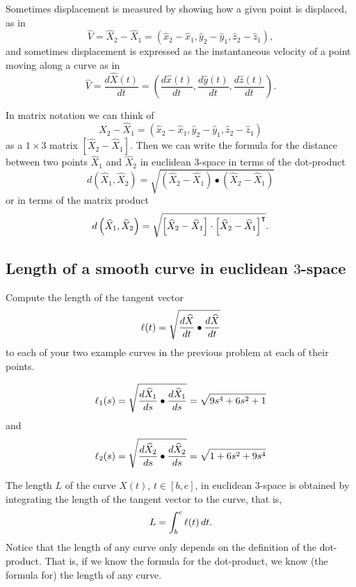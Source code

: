 \documentclass{ximera}
\begin{document}
Sometimes displacement is measured by showing how a given point is displaced,
as in%
\[
\hat{V}=\hat{X}_{2}-\hat{X}_{1}=\left(  \hat{x}_{2}-\hat{x}_{1},\hat{y}%
_{2}-\hat{y}_{1},\hat{z}_{2}-\hat{z}_{1}\right)  ,
\]
and sometimes displacement is expressed as the instantaneous velocity of a
point moving along a curve as in%
\[
\hat{V}=\frac{d\hat{X}\left(  t\right)  }{dt}=\left(  \frac{d\hat{x}\left(
t\right)  }{dt},\frac{d\hat{y}\left(  t\right)  }{dt},\frac{d\hat{z}\left(
t\right)  }{dt}\right)  .
\]

In matrix notation we can think of
\[
\hat{X}_{2}-\hat{X}_{1}=\left(  \hat{x}_{2}-\hat{x}_{1},\hat{y}_{2}-\hat
{y}_{1},\hat{z}_{2}-\hat{z}_{1}\right)
\]
as a $1\times3$ matrix $\left[\hat{X}_{2}-\hat{X}_{1}\right]$. Then we can
write the formula for the distance between two points $\hat{X}_{1}$ and
$\hat{X}_{2}$ in euclidean $3$-space in terms of the dot-product%
\begin{equation}
d\left(  \hat{X}_{1},\hat{X}_{2}\right)  =\sqrt{\left(  \hat{X}_{2}-\hat
{X}_{1}\right)  \bullet\left(  \hat{X}_{2}-\hat{X}_{1}\right)  } \label{13}%
\end{equation}
or in terms of the matrix product%
\[
d\left( \hat{X}_{1},\hat{X}_{2}\right) =\sqrt{\left[
  \hat{X}_{2}-\hat{X}_{1} \right] \cdot\left[\hat{X}_{2}-\hat{X}%
  _{1}\right]^\transpose }.
\]


\subsection*{Length of a smooth curve in euclidean $3$-space}

\begin{problem}
Compute the length of the tangent vector
\[
\l(t)=\sqrt{\frac{d\hat{X}}{dt}\bullet\frac{d\hat{X}}{dt}}%
\]
to each of your two example curves in the previous problem at each of
their points.



\begin{freeResponse}
\[
\ell_{1}(s) = \sqrt{\frac{d\widehat{X}_{1}}{ds}\bullet\frac{d\widehat{X}_{1}}{ds}} = \sqrt{9s^4 + 6s^2 +1}
\] and
\[ 
\ell_{2}(s) = \sqrt{\frac{d\widehat{X}_{2}}{ds}\bullet\frac{d\widehat{X}_{2}}{ds}} = \sqrt{1 + 6s^2 +9s^4}
\]
\end{freeResponse}

\end{problem}

\begin{definition}
The length $L$ of the curve $\hat{X}(t)$, $t\in[b,e] $, in euclidean
$3$-space is obtained by integrating the length of the tangent vector
to the curve, that is,%
\[
L=\int_{b}^{e} \ell(t)  \,dt.
\]
  Notice that the length of any curve only depends on the definition of
the dot-product. That is, if we know the formula for the dot-product, we know
(the formula for) the length of any curve.
\end{definition}
\end{document}
